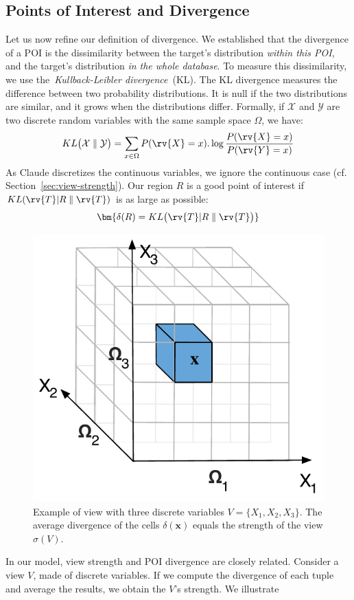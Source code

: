 \subsection{Points of Interest and Divergence}
Let us now refine our definition of divergence. We established that the
divergence of a POI is the dissimilarity between the target's distribution
\emph{within this POI}, and the target's distribution \emph{in the whole
database}.  To measure this dissimilarity, we use the~\emph{Kullback-Leibler
divergence}~(KL).  The KL divergence measures the difference between two
probability distributions. It is null if the two distributions are similar, and
it grows when the distributions differ.  Formally, if $\mathcal{X}$ and
$\mathcal{Y}$ are two discrete random variables with the same sample space
$\Omega$, we have:
\begin{equation}\label{eq:KL_disc} 
    KL\big( \mathcal{X} \parallel \mathcal{Y} \big) = 
    \sum_{x\in \Omega} P(\rv{X} = x).\log{\frac{P(\rv{X} = x)}{P(\rv{Y} = x)}} 
\end{equation}
As Claude discretizes the continuous variables, we ignore the continuous case
(cf.  Section~\ref{sec:view-strength}). Our region $R$ is a good point of
interest if $KL ( \rv{T} |R \parallel \rv{T} )$ is as large as possible:
\begin{equation}\label{eq:divergence}\bm{
    \delta(R) = KL \big( \rv{T} | R \parallel \rv{T}\big)
}\end{equation}
\begin{figure}[t!]
\centering
\includegraphics[width=0.4\columnwidth]{images/3Dtest}
\caption{Example of view with three discrete variables $V = \{X_1, X_2, X_3\}$.
The average divergence of the cells $\delta(\mathbf{x})$ equals the strength of
the view  $\sigma(V)$.}
\label{fig:binningexample}
\end{figure}
In our model, view strength and POI divergence are closely related.  Consider a
view $V$, made of discrete variables. If we compute the divergence of each
tuple and average the results, we obtain the $V$'s strength.  We illustrate
